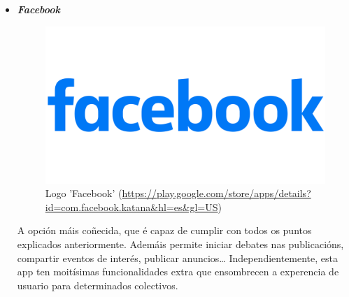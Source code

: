\begin{itemize}
	\item \textbf{\textit{Facebook}} 
	
	\begin{figure}[h!]
		\centering
		\includegraphics[scale=0.05]{06_imagenes/intro/Facebook-logo.png}
		\caption{Logo 'Facebook' (\url{https://play.google.com/store/apps/details?id=com.facebook.katana&hl=es&gl=US})}
	\end{figure}
	
	A opción máis coñecida, que é capaz de cumplir con todos os puntos explicados anteriormente. Ademáis permite iniciar  debates nas publicacións, compartir eventos de interés, publicar anuncios\dots 
	Independientemente, esta app ten moitísimas funcionalidades extra que ensombrecen a experencia de usuario para determinados colectivos.
	
\end{itemize}

